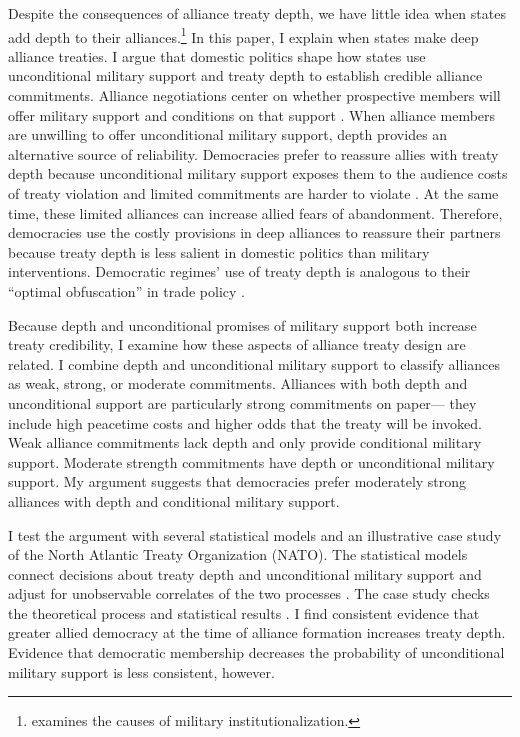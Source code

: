 \documentclass[12pt]{article}
\begin{document}
Despite the consequences of alliance treaty depth, we have little idea when states add depth to their alliances.\footnote{\citet{Mattes2012} examines the causes of military institutionalization.}
In this paper, I explain when states make deep alliance treaties.
I argue that domestic politics shape how states use unconditional military support and treaty depth to establish credible alliance commitments. 
Alliance negotiations center on whether prospective members will offer military support and conditions on that support \citep{Poast2019a}. 
When alliance members are unwilling to offer unconditional military support, depth provides an alternative source of reliability.
Democracies prefer to reassure allies with treaty depth because unconditional military support exposes them to the audience costs of treaty violation and limited commitments are harder to violate \citep{Mattes2012, Chibaetal2015}.
At the same time, these limited alliances can increase allied fears of abandonment. 
Therefore, democracies use the costly provisions in deep alliances to reassure their partners because treaty depth is less salient in domestic politics than military interventions. 
Democratic regimes' use of treaty depth is analogous to their ``optimal obfuscation'' in trade policy \citep{Kono2006}. 


Because depth and unconditional promises of military support both increase treaty credibility, I examine how these aspects of alliance treaty design are related. 
I combine depth and unconditional military support to classify alliances as weak, strong, or moderate commitments. 
Alliances with both depth and unconditional support are particularly strong commitments on paper--- they include high peacetime costs and higher odds that the treaty will be invoked. 
Weak alliance commitments lack depth and only provide conditional military support. 
Moderate strength commitments have depth or unconditional military support. 
My argument suggests that democracies prefer moderately strong alliances with depth and conditional military support.  


I test the argument with several statistical models and an illustrative case study of the North Atlantic Treaty Organization (NATO).
The statistical models connect decisions about treaty depth and unconditional military support and adjust for unobservable correlates of the two processes \citep{Braumoelleretal2018}. 
The case study checks the theoretical process and statistical results \citep{SeawrightGerring2008, Seawright2016}. 
I find consistent evidence that greater allied democracy at the time of alliance formation increases treaty depth.
Evidence that democratic membership decreases the probability of unconditional military support is less consistent, however. 
\end{document}
